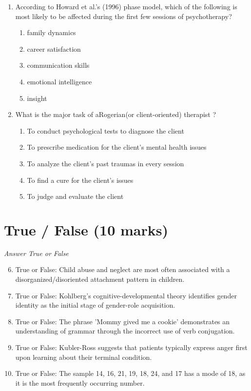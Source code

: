 \documentclass[12pt]{article}
\begin{document}
\begin{enumerate}[label=\arabic*.]
\item According to Howard et al.'s (1996) phase model, which of the following is most likely to be affected during the first few sessions of psychotherapy?
\begin{enumerate}[label=(\alph*)]
    \item family dynamics
    \item career satisfaction
    \item communication skills
    \item emotional intelligence
    \item insight
\end{enumerate}
\item What is the major task of aRogerian(or client-oriented) therapist ?
\begin{enumerate}[label=(\alph*)]
    \item To conduct psychological tests to diagnose the client
    \item To prescribe medication for the client's mental health issues
    \item To analyze the client's past traumas in every session
    \item To find a cure for the client's issues
    \item To judge and evaluate the client
\end{enumerate}
\end{enumerate}

\section*{True / False (10 marks)}
\textit{Answer True or False}
\begin{enumerate}[label=\arabic*.]
\setcounter{enumi}{5}
\item True or False: Child abuse and neglect are most often associated with a disorganized/disoriented attachment pattern in children.
\item True or False: Kohlberg's cognitive-developmental theory identifies gender identity as the initial stage of gender-role acquisition.
\item True or False: The phrase 'Mommy gived me a cookie' demonstrates an understanding of grammar through the incorrect use of verb conjugation.
\item True or False: Kubler-Ross suggests that patients typically express anger first upon learning about their terminal condition.
\item True or False: The sample 14, 16, 21, 19, 18, 24, and 17 has a mode of 18, as it is the most frequently occurring number.
\end{enumerate}
\end{document}
